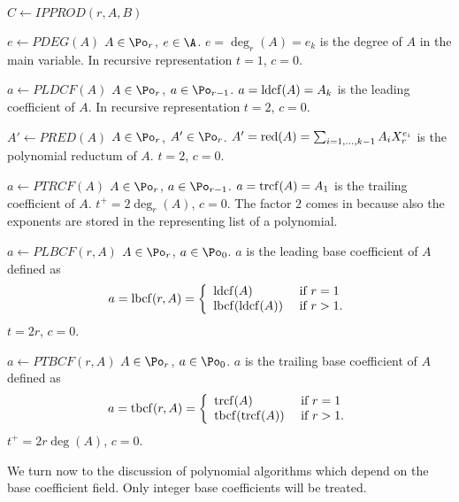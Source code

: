\begin{deflist}{$C \gets IPPROD(r,A,B)$}
\item[$e \gets PDEG(A)$] $A \in \Po_r$, $e \in \A$. 
     $e = \deg_r (A) = e_k$ is the degree of $A$ in the
     main variable.
     In recursive representation $t = 1$, $c = 0$. 
\item[$a \gets PLDCF(A)$] $A \in \Po_r$, $a \in \Po_{r-1}$. 
     $a = {\rm ldcf} (A) = A_k$ is the leading coefficient of $A$.
     In recursive representation $t = 2$, $c = 0$. 
\item[$A' \gets PRED(A)$] $A \in \Po_r$, $A' \in \Po_r$. 
     $A' = {\rm red} (A) = \sum_{i=1,\ldots,k-1} A_i X_r^{e_i}$ 
     is the polynomial reductum of $A$.
     $t = 2$, $c = 0$. 
\item[$a \gets PTRCF(A)$] $A \in \Po_r$, $a \in \Po_{r-1}$. 
     $a = {\rm trcf} (A) = A_1$ 
     is the trailing coefficient of $A$.
     $t^+ = 2 \deg_r(A)$, $c = 0$. 
     The factor $2$ comes in because also the exponents are 
     stored in the representing list of a polynomial. 
\item[$a \gets PLBCF(r,A)$] $A \in \Po_r$, $a \in \Po_0$. 
     $a$ is the leading base coefficient of $A$ defined as
     $$a = {\rm lbcf} (r,A) =  
         \left\{
         \begin{array}{ll}
              {\rm ldcf} (A) & \mbox{\rm \ if\ } r = 1 \\
              {\rm lbcf} ({\rm ldcf} (A)) & \mbox{\rm \ if\ } r > 1.
         \end{array}
         \right.
$$
     $t = 2 r$, $c = 0$. 
\item[$a \gets PTBCF(r,A)$] $A \in \Po_r$, $a \in \Po_0$. 
     $a$ is the trailing base coefficient of $A$ defined as
     $$a = {\rm tbcf} (r,A) =  
         \left\{
         \begin{array}{ll}
              {\rm trcf} (A) & \mbox{\rm \ if\ } r = 1 \\
              {\rm tbcf} ({\rm trcf} (A)) & \mbox{\rm \ if\ } r > 1.
         \end{array}
         \right.
$$
     $t^+ = 2 r \deg(A)$, $c = 0$. 
\end{deflist}

We turn now to the discussion of  
polynomial algorithms which depend on the 
base coefficient field. 
Only integer base coefficients will be treated. 


